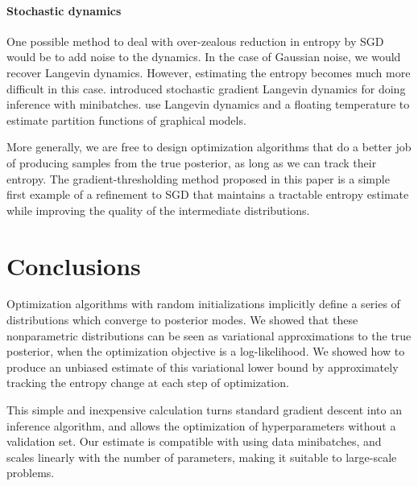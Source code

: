 \documentclass[]{article}
\begin{document}
\paragraph{Stochastic dynamics}
One possible method to deal with over-zealous reduction in entropy by SGD would be to add noise to the dynamics.
In the case of Gaussian noise, we would recover Langevin dynamics.
However, estimating the entropy becomes much more difficult in this case.
\citet{welling2011bayesian} introduced stochastic gradient Langevin dynamics for doing inference with minibatches.
\citet{ma2013estimating} use Langevin dynamics and a floating temperature to estimate partition functions of graphical models.

More generally, we are free to design optimization algorithms that do a better job of producing samples from the true posterior, as long as we can track their entropy.
The gradient-thresholding method proposed in this paper is a simple first example of a refinement to SGD that maintains a tractable entropy estimate while improving the quality of the intermediate distributions.



\section{Conclusions}

Optimization algorithms with random initializations implicitly define a series of distributions which converge to posterior modes.
We showed that these nonparametric distributions can be seen as variational approximations to the true posterior, when the optimization objective is a log-likelihood.
We showed how to produce an unbiased estimate of this variational lower bound by approximately tracking the entropy change at each step of optimization.

This simple and inexpensive calculation turns standard gradient descent into an inference algorithm, and allows the optimization of hyperparameters without a validation set.
Our estimate is compatible with using data minibatches, and scales linearly with the number of parameters, making it suitable to large-scale problems.











\end{document}
